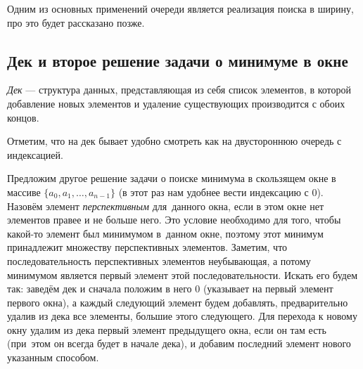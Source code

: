Одним из основных применений очереди является реализация поиска в ширину, про это будет рассказано позже.

\subsection{Дек и второе решение задачи о минимуме в окне}

\begin{definition}
    \textit{Дек} --- структура данных, представляющая из себя \mbox{список} элементов, в которой добавление новых элементов и удаление \mbox{существующих} производится с обоих концов. 
\end{definition}

\begin{center}
\end{center}

Отметим, что на дек бывает удобно смотреть как на двустороннюю очередь с индексацией.

Предложим другое решение задачи о поиске минимума в \mbox{скользящем} окне в массиве $\{a_0, a_1, \ldots, a_{n - 1}\}$ (в этот раз нам удобнее вести индексацию с $0$). Назовём элемент \textit{перспективным} для~данного окна, если в этом окне нет элементов правее и не больше него. Это условие необходимо для того, чтобы какой-то элемент был \mbox{минимумом} в~данном окне, поэтому этот минимум принадлежит множеству перспективных элементов. Заметим, что последовательность перспективных элементов неубывающая, а потому минимумом является первый элемент этой последовательности. Искать его будем так: заведём дек и сначала положим в него $0$ (\mbox{указывает} на первый элемент первого окна), а каждый следующий элемент будем добавлять, предварительно удалив из дека все элементы, большие этого следующего. Для перехода к новому окну удалим из дека первый элемент предыдущего окна, если он там есть (при~этом он всегда будет в начале дека), и добавим последний элемент нового указанным способом.

